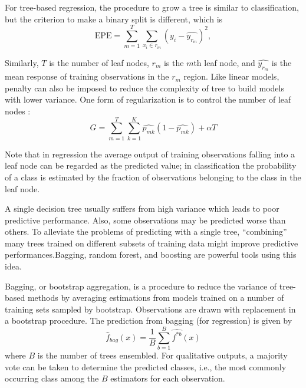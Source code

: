       For tree-based regression, the procedure to grow a tree is similar to classification, but the criterion to make a binary split is different, which is \cite{james2013introduction}
      \begin{equation}
        \mathrm{EPE} = \sum_{m=1}^T \sum_{x_i \in r_m}  (y_i - \hat{y_{r_m}})^2, 
      \end{equation}

      Similarly, $T$ is the number of leaf nodes, $r_m$ is the $m$th leaf node, and $\hat{y_{r_m}}$ is the mean response of training observations in the $r_m$ region. Like linear models, penalty can also be imposed to reduce the complexity of tree to build models with lower variance. One form of regularization is to control the number of leaf nodes \cite{james2013introduction}:
      \begin{equation}
        G = \sum_{m=1}^T \sum_{k=1}^K \hat{p_{mk}} (1 - \hat{p_{mk}}) + \alpha T
      \end{equation}

      Note that in regression the average output of training observations falling into a leaf node can be regarded as the predicted value; in classification the probability of a class is estimated by the fraction of observations belonging to the class in the leaf node. 
      
      A single decision tree usually suffers from high variance which leads to poor predictive performance. Also, some observations may be predicted worse than others. To alleviate the problems of predicting with a single tree, “combining” many trees trained on different subsets of training data might improve predictive performances.Bagging, random forest, and boosting are powerful tools using this idea.
      
      Bagging, or bootstrap aggregation, is a procedure to reduce the variance of tree-based methods by averaging estimations from models trained on a number of training sets sampled by bootstrap. Observations are drawn with replacement in a bootstrap procedure. The prediction from bagging (for regression) is given by \cite{james2013introduction}
      \begin{equation}
        \hat{f}_{bag} (x) = \frac{1}{B} \sum_{b=1}^B \hat{f^{*b}}(x)
      \end{equation}
      where $B$ is the number of trees ensembled. For qualitative outputs, a majority vote can be taken to determine the predicted classes, i.e., the most commonly occurring class among the $B$ estimators for each observation.

